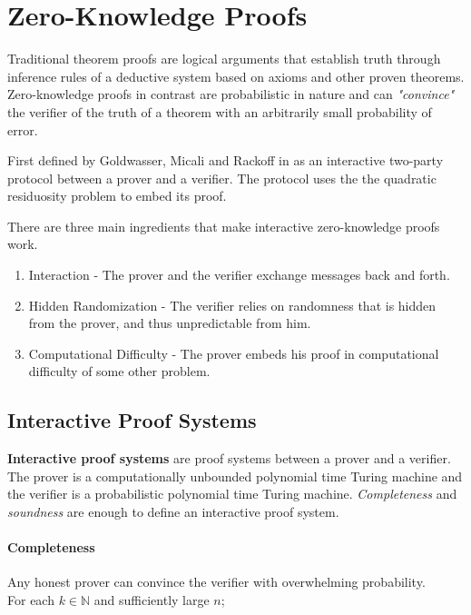 \section{Zero-Knowledge Proofs}

Traditional theorem proofs are logical arguments that establish truth through inference rules of a deductive system based on axioms and other proven theorems.
Zero-knowledge proofs in contrast are probabilistic in nature and can \textit{"convince"} the verifier of the truth of a theorem with an arbitrarily small probability of error. %

First defined by Goldwasser, Micali and Rackoff in \cite{GMR} as an interactive two-party protocol between a prover and a verifier.
The protocol uses the the quadratic residuosity problem to embed its proof.

There are three main ingredients that make interactive zero-knowledge proofs work. %

\begin{enumerate}
	\item Interaction - The prover and the verifier exchange messages back and forth.
	\item Hidden Randomization - The verifier relies on randomness that is hidden from the prover, and thus unpredictable from him.
	\item Computational Difficulty - The prover embeds his proof in computational difficulty of some other problem.
\end{enumerate}

\subsection{Interactive Proof Systems}
\textbf{Interactive proof systems} are proof systems between a prover and a verifier.
The prover is a computationally unbounded polynomial time Turing machine and the verifier is a probabilistic polynomial time Turing machine.
\textit{Completeness} and \textit{soundness} are enough to define an interactive proof system. 

\paragraph{Completeness}

Any honest prover can convince the verifier with overwhelming probability.\\
For each $k \in \mathbb{N}$ and sufficiently large $n$;

